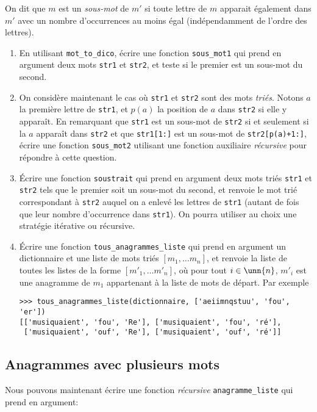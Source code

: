 \documentclass[10pt]{article}
\begin{document}
On dit que $m$ est un \emph{sous-mot} de $m'$ si toute lettre de $m$
apparait également dans $m'$ avec un nombre d'occurrences au moins
égal (indépendamment de l'ordre des lettres).

\begin{enumerate}[resume]
\item En utilisant \verb+mot_to_dico+, écrire une fonction
  \verb+sous_mot1+ qui prend en argument deux mots \verb+str1+ et
  \verb+str2+, et teste si le premier est un sous-mot du second.
\item On considère maintenant le cas où \verb+str1+ et \verb+str2+
  sont des mots \emph{triés}. Notons $a$ la première lettre de
  \verb+str1+, et $p(a)$ la position de $a$ dans \verb+str2+ si elle y
  apparaît. En remarquant que \verb+str1+ est un sous-mot de
  \verb+str2+ si et seulement si la $a$ apparaît dans \verb+str2+ et que
  \verb+str1[1:]+ est un sous-mot de \verb-str2[p(a)+1:]-, écrire une
  fonction \verb+sous_mot2+ utilisant une fonction auxiliaire
  \emph{récursive} pour répondre à cette question.
\item Écrire une fonction \verb+soustrait+ qui prend en argument deux
  mots triés \verb+str1+ et \verb+str2+ tels que le premier soit un
  sous-mot du second, et renvoie le mot trié correspondant à
  \verb+str2+ auquel on a enlevé les lettres de \verb+str1+ (autant de
  fois que leur nombre d'occurrence dans \verb+str1+). On pourra
  utiliser au choix une stratégie itérative ou récursive.
\item Écrire une fonction \verb+tous_anagrammes_liste+ qui prend en
  argument un dictionnaire et une liste de mots triés
  $[m_1,\dots m_n]$, et renvoie la liste de toutes les listes de la forme
  $[m'_1,\dots m'_n]$, où pour tout $i\in\unn{n}$, $m'_i$ est une
  anagramme de $m_1$ appartenant à la liste de mots de départ. Par exemple
  \begin{verbatim}
>>> tous_anagrammes_liste(dictionnaire, ['aeiimnqstuu', 'fou', 'er'])
[['musiquaient', 'fou', 'Re'], ['musiquaient', 'fou', 'ré'], 
 ['musiquaient', 'ouf', 'Re'], ['musiquaient', 'ouf', 'ré']]
  \end{verbatim}
\end{enumerate}

\subsection*{Anagrammes avec plusieurs mots}

Nous pouvons maintenant écrire une fonction \emph{récursive}
\verb+anagramme_liste+ qui prend en argument:
\end{document}
